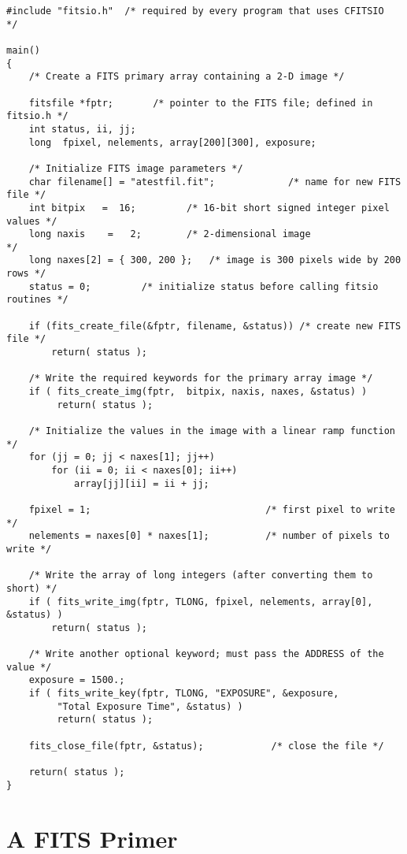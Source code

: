 \begin{verbatim}
#include "fitsio.h"  /* required by every program that uses CFITSIO  */

main()
{
    /* Create a FITS primary array containing a 2-D image */

    fitsfile *fptr;       /* pointer to the FITS file; defined in fitsio.h */
    int status, ii, jj;
    long  fpixel, nelements, array[200][300], exposure;

    /* Initialize FITS image parameters */
    char filename[] = "atestfil.fit";             /* name for new FITS file */
    int bitpix   =  16;         /* 16-bit short signed integer pixel values */
    long naxis    =   2;        /* 2-dimensional image                      */
    long naxes[2] = { 300, 200 };   /* image is 300 pixels wide by 200 rows */
    status = 0;         /* initialize status before calling fitsio routines */

    if (fits_create_file(&fptr, filename, &status)) /* create new FITS file */
        return( status );

    /* Write the required keywords for the primary array image */
    if ( fits_create_img(fptr,  bitpix, naxis, naxes, &status) )
         return( status );

    /* Initialize the values in the image with a linear ramp function */
    for (jj = 0; jj < naxes[1]; jj++)
        for (ii = 0; ii < naxes[0]; ii++)
            array[jj][ii] = ii + jj;

    fpixel = 1;                               /* first pixel to write      */
    nelements = naxes[0] * naxes[1];          /* number of pixels to write */

    /* Write the array of long integers (after converting them to short) */
    if ( fits_write_img(fptr, TLONG, fpixel, nelements, array[0], &status) )
        return( status );

    /* Write another optional keyword; must pass the ADDRESS of the value */
    exposure = 1500.;
    if ( fits_write_key(fptr, TLONG, "EXPOSURE", &exposure,
         "Total Exposure Time", &status) )
         return( status );

    fits_close_file(fptr, &status);            /* close the file */

    return( status );
}
\end{verbatim}

\chapter{  A FITS Primer }

